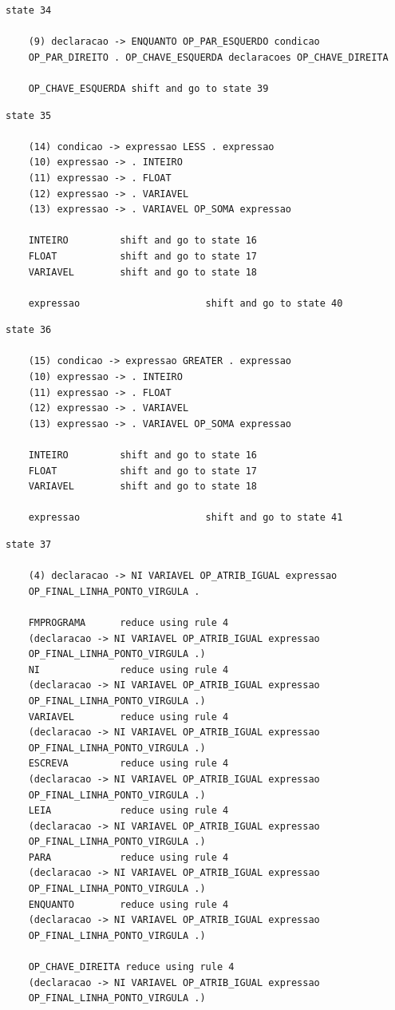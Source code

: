 \documentclass[a4paper,12pt]{article}
\begin{document}
\begin{verbatim}
state 34

    (9) declaracao -> ENQUANTO OP_PAR_ESQUERDO condicao 
    OP_PAR_DIREITO . OP_CHAVE_ESQUERDA declaracoes OP_CHAVE_DIREITA

    OP_CHAVE_ESQUERDA shift and go to state 39

\end{verbatim}

\begin{verbatim}
state 35

    (14) condicao -> expressao LESS . expressao
    (10) expressao -> . INTEIRO
    (11) expressao -> . FLOAT
    (12) expressao -> . VARIAVEL
    (13) expressao -> . VARIAVEL OP_SOMA expressao

    INTEIRO         shift and go to state 16
    FLOAT           shift and go to state 17
    VARIAVEL        shift and go to state 18

    expressao                      shift and go to state 40

\end{verbatim}

\begin{verbatim}
state 36

    (15) condicao -> expressao GREATER . expressao
    (10) expressao -> . INTEIRO
    (11) expressao -> . FLOAT
    (12) expressao -> . VARIAVEL
    (13) expressao -> . VARIAVEL OP_SOMA expressao

    INTEIRO         shift and go to state 16
    FLOAT           shift and go to state 17
    VARIAVEL        shift and go to state 18

    expressao                      shift and go to state 41

\end{verbatim}

\begin{verbatim}
state 37

    (4) declaracao -> NI VARIAVEL OP_ATRIB_IGUAL expressao 
    OP_FINAL_LINHA_PONTO_VIRGULA .

    FMPROGRAMA      reduce using rule 4 
    (declaracao -> NI VARIAVEL OP_ATRIB_IGUAL expressao 
    OP_FINAL_LINHA_PONTO_VIRGULA .)
    NI              reduce using rule 4 
    (declaracao -> NI VARIAVEL OP_ATRIB_IGUAL expressao 
    OP_FINAL_LINHA_PONTO_VIRGULA .)
    VARIAVEL        reduce using rule 4 
    (declaracao -> NI VARIAVEL OP_ATRIB_IGUAL expressao 
    OP_FINAL_LINHA_PONTO_VIRGULA .)
    ESCREVA         reduce using rule 4 
    (declaracao -> NI VARIAVEL OP_ATRIB_IGUAL expressao 
    OP_FINAL_LINHA_PONTO_VIRGULA .)
    LEIA            reduce using rule 4 
    (declaracao -> NI VARIAVEL OP_ATRIB_IGUAL expressao 
    OP_FINAL_LINHA_PONTO_VIRGULA .)
    PARA            reduce using rule 4 
    (declaracao -> NI VARIAVEL OP_ATRIB_IGUAL expressao 
    OP_FINAL_LINHA_PONTO_VIRGULA .)
    ENQUANTO        reduce using rule 4 
    (declaracao -> NI VARIAVEL OP_ATRIB_IGUAL expressao 
    OP_FINAL_LINHA_PONTO_VIRGULA .)
    
    OP_CHAVE_DIREITA reduce using rule 4 
    (declaracao -> NI VARIAVEL OP_ATRIB_IGUAL expressao 
    OP_FINAL_LINHA_PONTO_VIRGULA .)

\end{verbatim}
\end{document}
